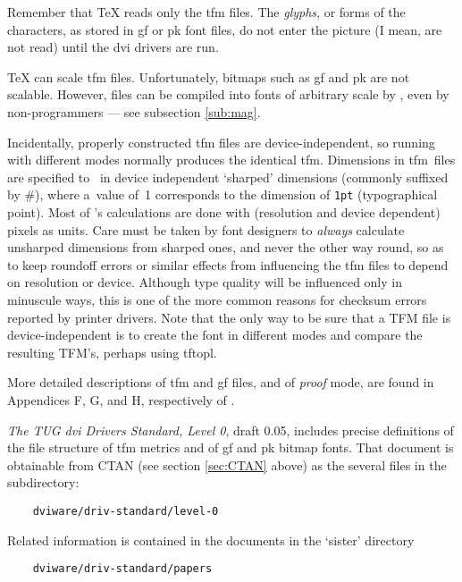 Remember that \TeX{} reads only the {\sc tfm} files.
The {\em glyphs}, or forms of the characters, as stored in {\sc gf}
or {\sc pk} font files, do not enter the picture
(I mean, are not read)
until the {\sc dvi} drivers are run.

\TeX{} can scale {\sc tfm} files.  Unfortunately, bitmaps such as
{\sc gf} and {\sc pk} are not scalable.
However, \MF{} files can be compiled into fonts of arbitrary scale
by \MF{}, even
by non-programmers --- see subsection \ref{sub:mag}.

Incidentally, properly constructed {\sc tfm} files are
device-independent, so running \MF{} with different modes normally
produces the identical {\sc tfm}.
Dimensions in {\sc tfm}~files are specified to~\MF{} in device
independent `sharped' dimensions (commonly suffixed by \#), where
a~value of~1 corresponds to the dimension of {\tt 1pt} (typographical
point).  Most of \MF{}'s calculations are done with (resolution and
device dependent) pixels as units.  Care must be taken by font
designers to {\em always\/} calculate unsharped dimensions from sharped
ones, and never the other way round, so as to keep roundoff errors or
similar effects from influencing the {\sc tfm} files to depend on
resolution or device.  Although type quality will be influenced only in
minuscule ways, this is one of the more common reasons for checksum
errors reported by printer drivers.
Note that the only way to be sure that a TFM file is device-independent
is to create the font in different modes and compare the resulting
TFM's, perhaps using {\sf tftopl}.

More detailed descriptions of {\sc tfm} and {\sc gf} files, and of
{\em proof\/} mode, are found in Appendices F, G, and H, respectively
of \MFbook{}.

{\sl The TUG {\sc dvi} Drivers Standard, Level 0}, draft 0.05, includes
precise definitions of the file structure of {\sc tfm} metrics and of
{\sc gf} and {\sc pk} bitmap fonts.
That document is obtainable from CTAN (see section \ref{sec:CTAN}
above) as the several files in the subdirectory:
\begin{verbatim}
    dviware/driv-standard/level-0
\end{verbatim}
Related information is contained in the documents in the `sister'
directory
\begin{verbatim}
    dviware/driv-standard/papers
\end{verbatim}



